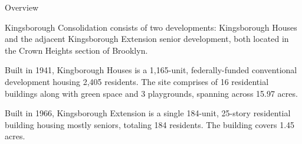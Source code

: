 Overview

Kingsborough Consolidation consists of two developments: Kingsborough Houses and the adjacent Kingsborough Extension senior development, both located in the Crown Heights section of Brooklyn. 

Built in 1941, Kingborough Houses is a 1,165-unit, federally-funded conventional development housing 2,405 residents. The site comprises of 16 residential buildings along with green space and 3 playgrounds, spanning across 15.97 acres. 

Built in 1966, Kingsborough Extension is a single 184-unit, 25-story residential building housing mostly seniors, totaling 184 residents. The building covers 1.45 acres.
